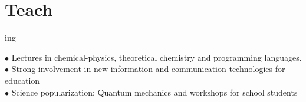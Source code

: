 \documentclass{cv-style}     %
\begin{document}
%

\vspace{-1mm}
\section{Teach}{ing}
  \vspace{-0.3cm}

$\bullet$ Lectures in chemical-physics, theoretical chemistry and programming languages.\\
$\bullet$ Strong involvement in new information and communication technologies for education\\
$\bullet$ Science popularization: Quantum mechanics and workshops for school students

\vspace*{-5mm}


\end{document}
